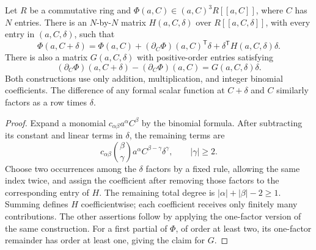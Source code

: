 \begin{lemma}
\label{alg:remainder}
Let $R$ be a commutative ring and
$\Phi(a,C)\in(a,C)^3R[[a,C]]$, where $C$ has $N$ entries. There is an
$N$-by-$N$ matrix $H(a,C,\delta)$ over $R[[a,C,\delta]]$, with every
entry in $(a,C,\delta)$, such that
\begin{equation}
 \Phi(a,C+\delta)
 =\Phi(a,C)+(\partial_C\Phi)(a,C)^{\mathsf T}\delta
        +\delta^{\mathsf T}H(a,C,\delta)\delta.
 \label{alg:remainder-formula}
\end{equation}
There is also a matrix $G(a,C,\delta)$ with positive-order entries
satisfying
\begin{equation}
 (\partial_C\Phi)(a,C+\delta)-(\partial_C\Phi)(a,C)
       =G(a,C,\delta)\delta.
 \label{alg:gradient-difference}
\end{equation}
Both constructions use only addition, multiplication, and integer
binomial coefficients. The difference of any formal scalar function
at $C+\delta$ and $C$ similarly factors as a row times $\delta$.
\end{lemma}

\begin{proof}
Expand a monomial $c_{\alpha\beta}a^\alpha C^\beta$ by the binomial
formula. After subtracting its constant and linear terms in $\delta$,
the remaining terms are
\[
 c_{\alpha\beta}\binom\beta\gamma
       a^\alpha C^{\beta-\gamma}\delta^\gamma,
 \qquad |\gamma|\geq2.
\]
Choose two occurrences among the $\delta$ factors by a fixed rule,
allowing the same index twice, and assign the coefficient after removing
those factors to the corresponding entry of $H$.
The remaining total degree is
$|\alpha|+|\beta|-2\geq1$. Summing defines $H$ coefficientwise;
each coefficient receives only finitely many contributions.
The other assertions follow by applying the one-factor version of the
same construction. For a first partial of $\Phi$, of order at least
two, its one-factor remainder has order at least one, giving the claim
for $G$.
\end{proof}


